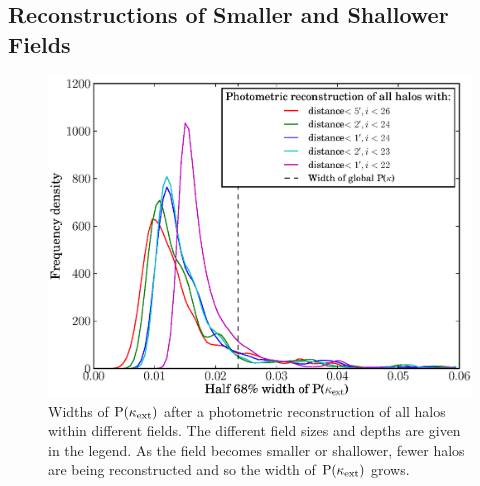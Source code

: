 \documentclass[useAMS,usenatbib]{mn2e}
\begin{document}
\subsection{Reconstructions of Smaller and Shallower Fields}

\begin{figure}
\includegraphics[width=\columnwidth]{figs/widths2.eps}
\caption{Widths of ${\rm P}(\kappa_{\rm ext})$ after a photometric reconstruction of all halos within different fields. The different field sizes and depths are given in the legend. As the field becomes smaller or shallower, fewer halos are being reconstructed and so the width of ${\rm P}(\kappa_{\rm ext})$ grows.}
\label{fig:width2}
\end{figure}
\end{document}
